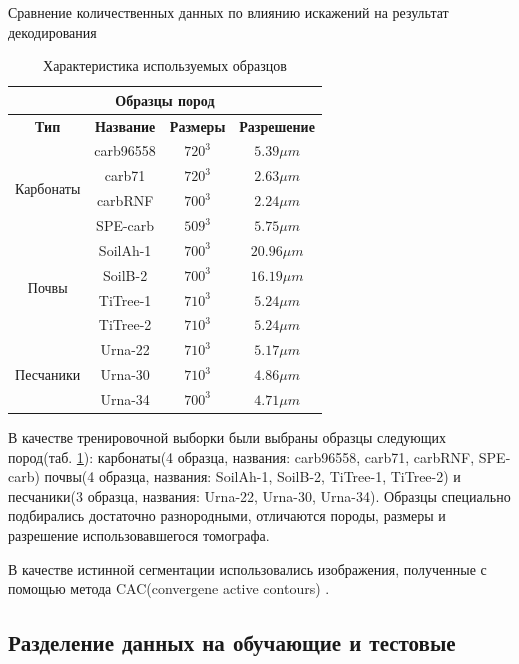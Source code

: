 \documentclass[12pt, a4paper]{extarticle}
\begin{document}
\begin{table}[h!]
\caption{Сравнение количественных данных по влиянию искажений на результат декодирования}
\begin{center}
\begin{tabular}{|c|c|c|c|}
\hline
\multicolumn{4}{|c|}{\textbf{Образцы пород}}\\
\hline
\textbf{Тип} & \textbf{Название} & \textbf{Размеры} 
	& \textbf{Разрешение} \\ \hline
\multirow{4}{*}{Карбонаты} & carb96558 & $720^3$ & $5.39 \mu m$ \\ 
& carb71 & $720^3$ & $2.63 \mu m$ \\ 
& carbRNF & $700^3$ & $2.24 \mu m$ \\ 
& SPE-carb & $509^3$ & $ 5.75 \mu m$ \\ \hline
\multirow{4}{*}{Почвы} & SoilAh-1 & $700^3$ & $20.96 \mu m$ \\ 
& SoilB-2 & $700^3$ & $16.19 \mu m$ \\ 
& TiTree-1 & $710^3$ & $ 5.24 \mu m$ \\ 
& TiTree-2 & $710^3$ & $ 5.24 \mu m$ \\ \hline
\multirow{3}{*}{Песчаники} & Urna-22 & $710^3$ & $5.17 \mu m$ \\ 
& Urna-30 & $710^3$ & $4.86 \mu m$ \\ 
& Urna-34 & $700^3$ & $4.71 \mu m$ \\ \hline
\end{tabular}
\end{center}
\caption{Характеристика используемых образцов}
\label{samples}
\end{table}

В качестве тренировочной выборки были выбраны образцы следующих пород(таб. \ref{samples}): карбонаты(4 образца, названия: carb96558, carb71, carbRNF, SPE-carb)  почвы(4 образца, названия: SoilAh-1, SoilB-2, TiTree-1, TiTree-2) и песчаники(3 образца, названия: Urna-22, Urna-30, Urna-34). Образцы специально подбирались достаточно разнородными, отличаются породы, размеры и разрешение использовавшегося томографа.

В	качестве истинной сегментации использовались изображения, полученные с помощью метода CAC(convergene active contours) \cite{12}.


\subsection{Разделение данных на обучающие и тестовые}
\end{document}
